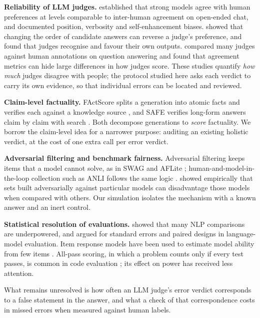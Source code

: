 \textbf{Reliability of LLM judges.} \citet{zheng2023judging} established that strong models agree with human preferences at levels comparable to inter-human agreement on open-ended chat, and documented position, verbosity and self-enhancement biases. \citet{wang2024fair} showed that changing the order of candidate answers can reverse a judge's preference, and \citet{panickssery2024self} found that judges recognise and favour their own outputs. \citet{thakur2025judging} compared many judges against human annotations on question answering and found that agreement metrics can hide large differences in how judges score. These studies quantify \emph{how much} judges disagree with people; the protocol studied here asks each verdict to carry its own evidence, so that individual errors can be located and reviewed.

\textbf{Claim-level factuality.} FActScore splits a generation into atomic facts and verifies each against a knowledge source \citep{min2023factscore}, and SAFE verifies long-form answers claim by claim with search \citep{wei2024longform}. Both decompose generations to \emph{score} factuality. We borrow the claim-level idea for a narrower purpose: auditing an existing holistic verdict, at the cost of one extra call per error verdict.

\textbf{Adversarial filtering and benchmark fairness.} Adversarial filtering keeps items that a model cannot solve, as in SWAG \citep{zellers2018swag} and AFLite \citep{lebras2020adversarial}; human-and-model-in-the-loop collection such as ANLI follows the same logic \citep{nie2020anli}. \citet{phang2022adversarially} showed empirically that sets built adversarially against particular models can disadvantage those models when compared with others. Our simulation isolates the mechanism with a known answer and an inert control.

\textbf{Statistical resolution of evaluations.} \citet{card2020power} showed that many NLP comparisons are underpowered, and \citet{miller2024errorbars} argued for standard errors and paired designs in language-model evaluation. Item response models have been used to estimate model ability from few items \citep{polo2024tiny}. All-pass scoring, in which a problem counts only if every test passes, is common in code evaluation \citep{chen2021codex}; its effect on power has received less attention.

What remains unresolved is how often an LLM judge's error verdict corresponds to a false statement in the answer, and what a check of that correspondence costs in missed errors when measured against human labels.


